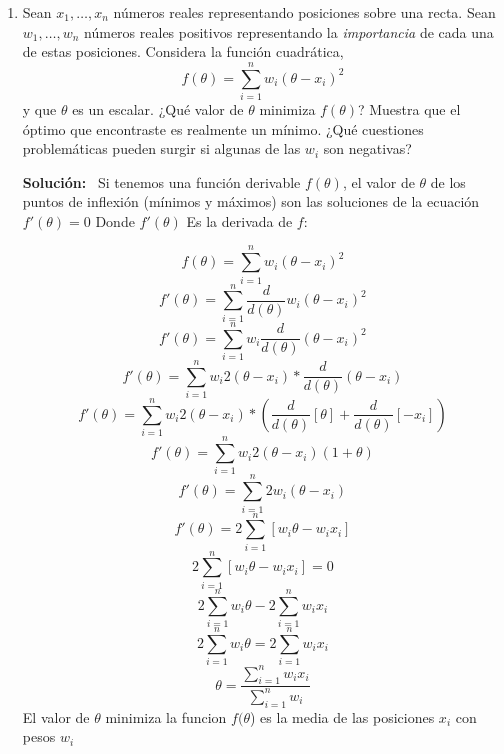 \documentclass[11pt,letterpaper]{article}
\newenvironment{solution}{%
  \noindent\begin{shaded}
  \textbf{Solución:}\ }{
  \end{shaded}%
}
\begin{document}
\begin{enumerate}
\item%
  Sean \(x_1,\dots,x_n\) números reales representando posiciones sobre
  una recta.  Sean \(w_1,\dots,w_n\) números reales positivos
  representando la \emph{importancia} de cada una de estas
  posiciones. Considera la función cuadrática,
  \[ f(\theta) = \sum_{i=1}^n w_i\left(\theta-x_i\right)^2 \]
  y que \(\theta\) es un escalar. ¿Qué valor de \(\theta\) minimiza
  \(f(\theta)\)? Muestra que el óptimo que encontraste es realmente un
  mínimo. ¿Qué cuestiones problemáticas pueden surgir si algunas de
  las \(w_i\) son negativas?
  \begin{solution}
    Si tenemos una función derivable \(f(\theta)\), el valor de \(\theta\)  de los puntos de inflexión (mínimos y máximos) son las soluciones de la ecuación \(f'(\theta) = 0\) Donde \(f'(\theta)\) Es la derivada de \(f\):

\[ f(\theta) = \sum_{i=1}^n w_i\left(\theta-x_i\right)^2 \]
\[ f'(\theta) = \sum_{i=1}^n \frac{d}{d(\theta)}w_i\left(\theta-x_i\right)^2 \]
\[ f'(\theta) = \sum_{i=1}^n w_i\frac{d}{d(\theta)}\left(\theta-x_i\right)^2 \]
\[ f'(\theta) = \sum_{i=1}^n w_i  2(\theta - x_i) * \frac{d}{d(\theta)}\left(\theta-x_i\right) \]
\[ f'(\theta) = \sum_{i=1}^n w_i  2(\theta - x_i) * (\frac{d}{d(\theta)}[\theta] + \frac{d}{d(\theta)}[- x_i]) \]
\[ f'(\theta) = \sum_{i=1}^n w_i  2(\theta - x_i)(1+\theta) \]
\[ f'(\theta) = \sum_{i=1}^n 2 w_i(\theta - x_i)\]
\[ f'(\theta) = 2\sum_{i=1}^n[ w_i\theta - w_i x_i]\]
\[2\sum_{i=1}^n[ w_i\theta - w_i x_i] = 0\]
\[2\sum_{i=1}^n w_i\theta - 2\sum_{i=1}^nw_i x_i\]
\[2\sum_{i=1}^n w_i\theta = 2\sum_{i=1}^nw_i x_i\]
\[\theta = \frac{\sum_{i=1}^n w_i x_i}{\sum_{i=1}^n w_i}\]
El valor de \(\theta\)  minimiza la funcion \(f(\theta\)) es la media de las posiciones \(x_i\)  con pesos \(w_i\)


\end{solution}
\end{enumerate}
\end{document}
